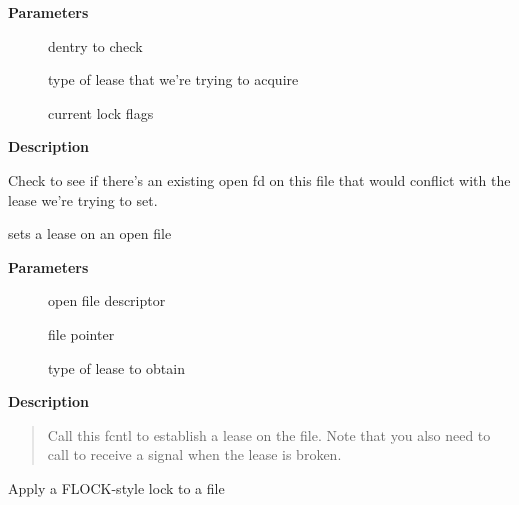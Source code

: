 \documentclass[a4paper,8pt,english]{sphinxmanual}
\begin{document}
\textbf{Parameters}
\begin{description}
\item[{}] \leavevmode
dentry to check

\item[{}] \leavevmode
type of lease that we're trying to acquire

\item[{}] \leavevmode
current lock flags

\end{description}

\textbf{Description}

Check to see if there's an existing open fd on this file that would
conflict with the lease we're trying to set.

\begin{fulllineitems}
\label{filesystems/index:c.fcntl_setlease}
sets a lease on an open file

\end{fulllineitems}


\textbf{Parameters}
\begin{description}
\item[{}] \leavevmode
open file descriptor

\item[{}] \leavevmode
file pointer

\item[{}] \leavevmode
type of lease to obtain

\end{description}

\textbf{Description}
\begin{quote}

Call this fcntl to establish a lease on the file.
Note that you also need to call  to
receive a signal when the lease is broken.
\end{quote}

\begin{fulllineitems}
\label{filesystems/index:c.flock_lock_inode_wait}
Apply a FLOCK-style lock to a file

\end{fulllineitems}
\end{document}
